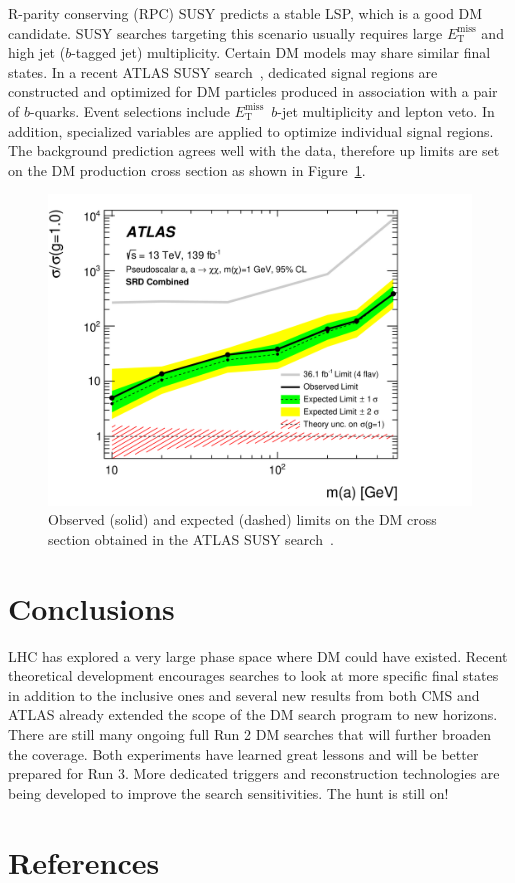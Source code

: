 \documentclass{moriond}
\def\et{E_\textrm{T}^{\textrm{miss}}}
\begin{document}
R-parity conserving (RPC) SUSY predicts a stable LSP, which is a good DM candidate. SUSY searches targeting this
scenario usually requires large $\et$ and high jet ($b$-tagged jet)
multiplicity. Certain DM models may share similar final states. In a recent
ATLAS SUSY search~\cite{dmbb}, dedicated signal regions are constructed and
optimized for DM particles produced in association with a pair of $b$-quarks. Event selections include $\et$\, $b$-jet multiplicity and lepton veto. In addition, specialized variables are applied to optimize individual signal regions. The background prediction agrees well with the data, therefore up limits are set on the DM production cross section as shown in Figure~\ref{fig:dmbb}.   

\begin{figure} [htb]
\centerline{\includegraphics[width=0.5\linewidth]{DMBB}}
\caption[]{Observed (solid) and expected (dashed) limits on the DM cross section obtained in the ATLAS SUSY search~\cite{dmbb}.}
\label{fig:dmbb}
\end{figure}

\section{Conclusions}

LHC has explored a very large phase space where DM could have existed.
Recent theoretical development encourages searches to look at more specific
final states in addition to the inclusive ones and several new results from
both CMS and ATLAS already extended the scope of the DM search program to new
horizons. There are still many ongoing full Run 2 DM searches that will further
broaden the coverage. Both experiments have learned great lessons and will be better prepared for Run 3. More dedicated triggers and reconstruction technologies are being developed to improve the search sensitivities. The hunt is still on!

\section*{References}
\end{document}

